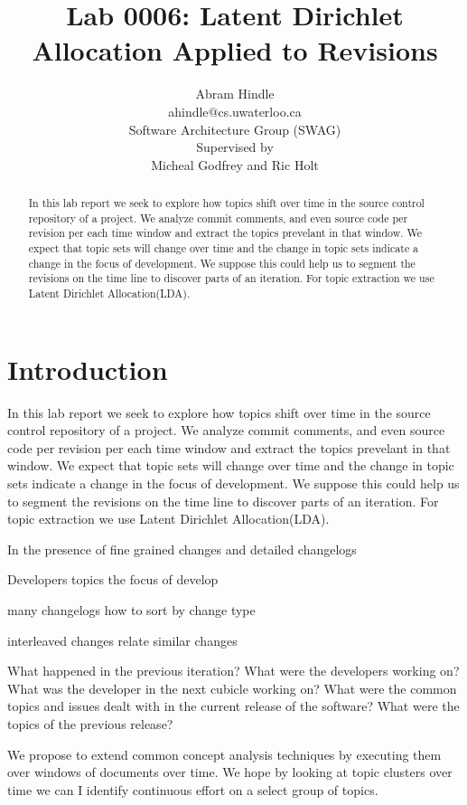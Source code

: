 \documentclass{report}
\author{Abram Hindle\\
ahindle@cs.uwaterloo.ca\\
Software Architecture Group (SWAG)\\
Supervised by\\
Micheal Godfrey and Ric Holt
}
\title{Lab 0006: Latent Dirichlet Allocation Applied to Revisions}
\newcommand{\lda}{Latent Dirichlet Allocation}
\begin{document}
\maketitle
\begin{abstract}

  In this lab report we seek to explore how topics shift over time in
  the source control repository of a project. We analyze commit
  comments, and even source code per revision per each time window and
  extract the topics prevelant in that window. We expect that topic
  sets will change over time and the change in topic sets indicate a
  change in the focus of development. We suppose this could help us to
  segment the revisions on the time line to discover parts of an
  iteration. For topic extraction we use \lda (LDA).

\end{abstract}

\section{Introduction}


In this lab report we seek to explore how topics shift over time in
the source control repository of a project. We analyze commit
comments, and even source code per revision per each time window and
extract the topics prevelant in that window. We expect that topic sets
will change over time and the change in topic sets indicate a change
in the focus of development. We suppose this could help us to segment
the revisions on the time line to discover parts of an iteration. For
topic extraction we use \lda (LDA).

% 

In the presence of fine grained changes and detailed changelogs

Developers topics the focus of develop

many changelogs how to sort by change type

interleaved changes relate similar changes

What happened in the previous iteration? What were the developers
working on? What was the developer in the next cubicle working on?
What were the common topics and issues dealt with in the current
release of the software? What were the topics of the previous release?

We propose to extend common concept analysis techniques by executing
them over windows of documents over time. We hope by looking at topic
clusters over time we can I identify continuous effort on a select
group of topics.
\end{document}
